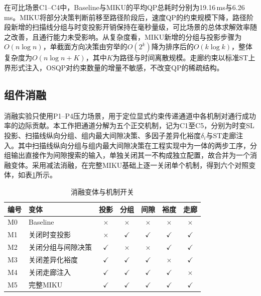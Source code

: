 \documentclass[a4paper,11pt]{ctexart}
\theoremstyle{definition}
\begin{document}
在可比场景C1--C4中，Baseline与MIKU的平均QP总耗时分别为19.16\,ms与6.26\,ms。MIKU将部分决策判断前移至路径阶段后，速度QP的约束规模下降，路径阶段新增的扫描线分组与时变投影开销保持在毫秒量级，可比场景的总体求解效率随之改善，且通行能力未受影响。从复杂度看，MIKU新增的分组与投影步骤为$O(n \log n)$，单截面方向决策由穷举的$O(2^k)$降为排序后的$O(k \log k)$，整体复杂度为$O(n \log n + K)$，其中$K$为路径与时间离散规模。走廊约束以标准ST上界形式注入，OSQP对约束数量的增量不敏感，不改变QP的稀疏结构。

\subsection{组件消融}
\label{subsec:exp_ablation}

消融实验只使用P1--P4压力场景，用于定位显式约束传递通道中各机制对通行成功率的边际贡献。本工作把通道分解为五个正交机制，记为C1至C5，分别为时变SL投影、扫描线纵向分组、组内最大间隙决策、多因子差异化裕度$\delta_i$与ST走廊注入。其中扫描线纵向分组与组内最大间隙决策在工程实现中为一体的两步工序，分组输出直接作为间隙搜索的输入，单独关闭其一不构成独立配置，故合并为一个消融变体。采用减法消融，在完整MIKU基础上逐一关闭单个机制，得到六个对照变体，如表\ref{tab:exp_ablation_matrix}所示。

\begin{table}[htbp]
\centering
\caption{消融变体与机制开关}
\label{tab:exp_ablation_matrix}
\small
\begin{tabular}{llccccc}
\toprule
\textbf{编号} & \textbf{变体} & 投影 & 分组 & 间隙 & 裕度 & 走廊 \\
\midrule
M0 & Baseline             & $\times$    & $\times$    & $\times$    & $\times$    & $\times$    \\
M1 & 关闭时变投影         & $\times$    & $\checkmark$ & $\checkmark$ & $\checkmark$ & $\checkmark$ \\
M2 & 关闭分组与间隙决策   & $\checkmark$ & $\times$    & $\times$    & $\checkmark$ & $\checkmark$ \\
M3 & 关闭差异化裕度       & $\checkmark$ & $\checkmark$ & $\checkmark$ & $\times$    & $\checkmark$ \\
M4 & 关闭走廊注入         & $\checkmark$ & $\checkmark$ & $\checkmark$ & $\checkmark$ & $\times$    \\
M5 & 完整MIKU             & $\checkmark$ & $\checkmark$ & $\checkmark$ & $\checkmark$ & $\checkmark$ \\
\bottomrule
\end{tabular}
\end{table}
\end{document}
